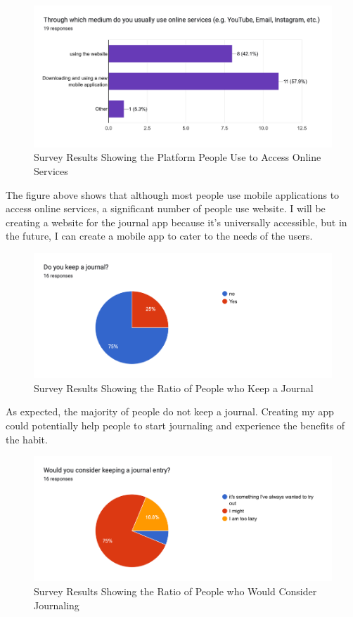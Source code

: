 \begin{figure}[H]
    \includegraphics[width=\textwidth]{Assets/survey_medium_of_service.png}
    \caption{Survey Results Showing the Platform People Use to Access Online Services}
    \label{fig:survey_medium_of_service}
\end{figure}

The figure above shows that although most people use mobile applications to access online services, a significant number of people use website. I will be creating a website for the journal app because it's universally accessible, but in the future, I can create a mobile app to cater to the needs of the users.


\begin{figure}[H]
  \includegraphics[width=\textwidth]{Assets/survey_keep_journal_ratio.png}
  \caption{Survey Results Showing the Ratio of People who Keep a Journal}
  \label{fig:survey_keep_journal_ratio}
\end{figure}

As expected, the majority of people do not keep a journal. Creating my app could potentially help people to start journaling and experience the benefits of the habit.


\begin{figure}[H]
    \includegraphics[width=\textwidth]{Assets/survey_consider_journal.png}
    \caption{Survey Results Showing the Ratio of People who Would Consider Journaling}
    \label{fig:survey_consider_journal}
\end{figure}

